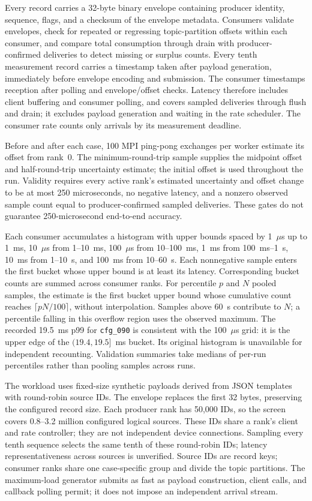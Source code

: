 \documentclass[10pt]{article}
\begin{document}
Every record carries a 32-byte binary envelope containing producer identity,
sequence, flags, and a checksum of the envelope metadata.  Consumers validate
envelopes, check for repeated or regressing topic-partition offsets within each
consumer, and compare total consumption through drain with producer-confirmed
deliveries to detect missing or surplus counts.
Every tenth measurement record carries a timestamp taken after payload
generation, immediately before envelope encoding and submission.  The consumer
timestamps reception after polling and envelope/offset checks.  Latency therefore
includes client buffering and consumer polling, and covers sampled deliveries
through flush and drain; it excludes payload generation and waiting in the rate
scheduler.  The consumer rate counts only arrivals by its measurement deadline.

Before and after each case, 100 MPI ping-pong exchanges per worker estimate its
offset from rank~0.  The minimum-round-trip sample supplies the midpoint offset
and half-round-trip uncertainty estimate; the initial offset is used throughout
the run.  Validity requires every active rank's estimated uncertainty and offset
change to be at most 250 microseconds, no negative latency, and a nonzero observed
sample count equal to producer-confirmed sampled deliveries.  These gates do not
guarantee 250-microsecond end-to-end accuracy.

Each consumer accumulates a histogram with upper bounds spaced by
1~$\mu$s up to 1~ms, 10~$\mu$s from 1--10~ms, 100~$\mu$s from 10--100~ms,
1~ms from 100~ms--1~s, 10~ms from 1--10~s, and 100~ms from 10--60~s.
Each nonnegative sample enters the first bucket whose upper bound is at least
its latency.  Corresponding bucket counts are summed across consumer ranks.
For percentile $p$ and $N$ pooled samples, the estimate is the first bucket
upper bound whose cumulative count reaches $\lceil pN/100\rceil$, without
interpolation.  Samples above 60~s contribute to $N$; a percentile falling
in this overflow region uses the observed maximum.  The recorded 19.5~ms
p99 for \texttt{cfg\_090} is consistent with the 100~$\mu$s grid: it is the
upper edge of the $(19.4,19.5]$~ms bucket.  Its original histogram is unavailable
for independent recounting.  Validation summaries take medians of per-run
percentiles rather than pooling samples across runs.

The workload uses fixed-size synthetic payloads derived from JSON templates
with round-robin source IDs.  The envelope replaces the first 32 bytes,
preserving the configured record size.
Each producer rank has 50,000 IDs, so the screen covers 0.8--3.2 million configured
logical sources.  These IDs share a rank's client and rate controller; they are
not independent device connections.  Sampling every tenth sequence selects the
same tenth of these round-robin IDs; latency representativeness across sources
is unverified.  Source IDs are record keys; consumer
ranks share one case-specific group and divide the topic partitions.  The
maximum-load generator submits as fast as payload construction, client calls,
and callback polling permit; it does not impose an independent arrival stream.
\end{document}
